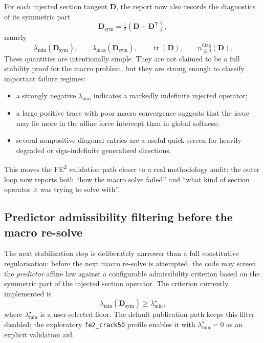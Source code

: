 For each injected section tangent \(\mathbf{D}\), the report now also records
the diagnostics of its symmetric part
\begin{equation}
  \mathbf{D}_{\mathrm{sym}}
  = \tfrac{1}{2}\left(\mathbf{D}+\mathbf{D}^\mathsf{T}\right),
  \label{eq:ms-pub-section-symmetric-part}
\end{equation}
namely
\begin{equation}
  \lambda_{\min}(\mathbf{D}_{\mathrm{sym}}), \qquad
  \lambda_{\max}(\mathbf{D}_{\mathrm{sym}}), \qquad
  \operatorname{tr}(\mathbf{D}), \qquad
  n_{\le 0}^{\mathrm{diag}}(\mathbf{D}).
  \label{eq:ms-pub-section-operator-diagnostics}
\end{equation}
These quantities are intentionally simple.  They are not claimed to be a full
stability proof for the macro problem, but they are strong enough to classify
important failure regimes:
\begin{itemize}
  \item a strongly negative \(\lambda_{\min}\) indicates a markedly indefinite
    injected operator;
  \item a large positive trace with poor macro convergence suggests that the
    issue may lie more in the affine force intercept than in global softness;
  \item several nonpositive diagonal entries are a useful quick-screen for
    heavily degraded or sign-indefinite generalized directions.
\end{itemize}
This moves the FE\textsuperscript{2} validation path closer to a real
methodology audit: the outer loop now reports both ``how the macro solve
failed'' and ``what kind of section operator it was trying to solve with''.

\subsection{Predictor admissibility filtering before the macro re-solve}
\label{sec:ms-pub-predictor-admissibility}

The next stabilization step is deliberately narrower than a full constitutive
regularisation: before the next macro re-solve is attempted, the code may
screen the \emph{predictor} affine law against a configurable admissibility
criterion based on the symmetric part of the injected section operator.  The
criterion currently implemented is
\begin{equation}
  \lambda_{\min}\!\left(
    \mathbf{D}_{\mathrm{sym}}
  \right)
  \ge \lambda_{\min}^{\star},
  \label{eq:ms-pub-predictor-admissibility}
\end{equation}
where \(\lambda_{\min}^{\star}\) is a user-selected floor.  The default
publication path keeps this filter disabled; the exploratory
\texttt{fe2\_crack50} profile enables it with
\(\lambda_{\min}^{\star}=0\) as an explicit validation aid.

